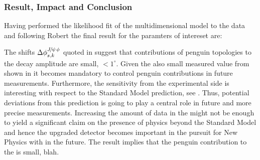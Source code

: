 \subsubsection{Result, Impact and Conclusion}

Having performed the likelihood fit of the multidimensional model to the data and following \cite{}Robert
the final result for the paramters of intereset are:

The shifts $\Delta\phi^{{J\mskip -3mu/\mskip -2mu\psi\mskip 2mu}\phi}_{s,{k}}$ quoted in 
suggest that contributions of penguin topologies to the \BsJpsiPhi decay amplitude are
small, $<1^\circ$. Given the also small \phis measured value from \lhcb shown in 
it becomes mandatory to control penguin contributions in future \phis measurements.
Furthermore, the sensitivity from the experimental side is interesting with respect to
the Standard Model prediction, see . Thus, potential deviations from this
prediction is going to play a central role in future and more precise \phis measurements.
Increasing the amount of data in the \lhc \runtwo might not be enough to yield
a significant claim on the presence of physics beyond the Standard Model and hence
the upgraded \lhcb detector becomes important in the pursuit for New Physics with \phis in the future.
The result implies that the penguin contribution to the \phis is small, blah.
